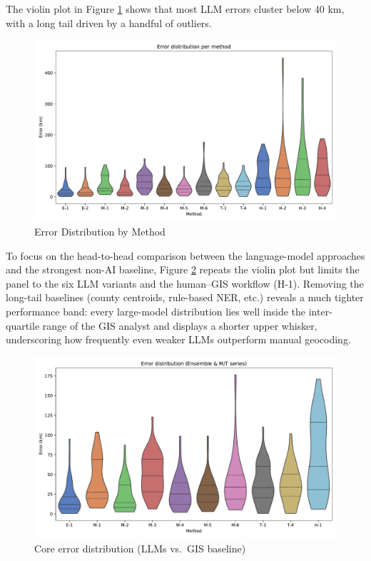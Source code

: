 \clearpage

The violin plot in Figure \ref{fig:violin} shows that most LLM errors
cluster below 40 km, with a long tail driven by a handful of outliers.

\begin{figure}
\centering
\includegraphics[width=\textwidth,height=0.8\textheight,keepaspectratio]{figures/error_violin_methods.pdf}
\caption{Error Distribution by Method}\label{fig:violin}
\end{figure}

To focus on the head-to-head comparison between the language-model
approaches and the strongest non-AI baseline, Figure
\ref{fig:violin_core} repeats the violin plot but limits the panel to
the six LLM variants and the human--GIS workflow (H-1). Removing the
long-tail baselines (county centroids, rule-based NER, etc.) reveals a
much tighter performance band: every large-model distribution lies well
inside the inter-quartile range of the GIS analyst and displays a
shorter upper whisker, underscoring how frequently even weaker LLMs
outperform manual geocoding.

\begin{figure}
\centering
\includegraphics[width=\textwidth,height=0.8\textheight,keepaspectratio]{figures/error_violin_core_methods.pdf}
\caption{Core error distribution (LLMs vs.~GIS
baseline)}\label{fig:violin_core}
\end{figure}

